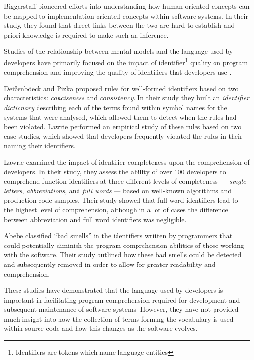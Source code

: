 Biggerstaff \etal \cite{Biggerstaff93a} pioneered efforts into understanding how human-oriented concepts can be mapped to implementation-oriented concepts within software systems. In their study, they found that direct links between the two are hard to establish and priori knowledge is required to make such an inference.

Studies of the relationship between mental models and the language used by developers have primarily focused on the impact of identifier\footnote{Identifiers are tokens which name language entities} quality on program 
comprehension \cite{Takang96a,Anquetil98a,Caprile99a,Maletic01a,Deissenboeck06a,Rilling03a,Caprile00a,Lawrie06a,Lawrie06b,Lawrie07a} and improving the quality of identifiers that developers use \cite{Deissenboeck06a,Lawrie07a,Caprile99a,Caprile00a, Abebe09b}.

Dei{\ss}enb\"{o}eck and Pizka \cite{Deissenboeck06a} proposed rules for well-formed identifiers based on two characteristics: \emph{conciseness} and \emph{consistency}. In their study they built an \emph{identifier dictionary} describing each of the terms found within symbol names for the systems that were analysed, which allowed them to detect when the rules had been violated. Lawrie \etal \cite{Lawrie07a} performed an empirical study of these rules based on two case studies, which showed that developers frequently violated the rules in their naming their identifiers.

Lawrie \etal \cite{Lawrie06a} examined the impact of identifier completeness upon the comprehension of developers. In their study, they assess the ability of over 100 developers to comprehend function identifiers at three different levels of completeness --- \emph{single letters}, \emph{abbreviations}, and \emph{full words} --- based on well-known algorithms and production code samples. Their study showed that full word identifiers lead to the highest level of comprehension, although in a lot of cases the difference between abbreviation and full word identifiers was negligible.

Abebe \etal \cite{Abebe09b} classified ``bad smells'' in the identifiers written by programmers that could potentially diminish the program comprehension abilities of those working with the software. Their study outlined how these bad smells could be detected and subsequently removed in order to allow for greater readability and comprehension.

These studies have demonstrated that the language used by developers is important in facilitating program comprehension required for development and subsequent maintenance of software systems. However, they have not provided much insight into how the collection of terms forming the vocabulary is used within source code and how this changes as the software evolves.

